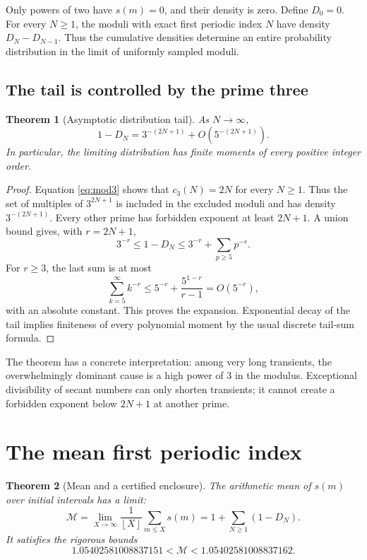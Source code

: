 \documentclass[11pt,a4paper]{article}
\numberwithin{equation}{section}
\newtheorem{theorem}{Theorem}[section]
\theoremstyle{definition}
\newcommand{\floor}[1]{\left\lfloor #1\right\rfloor}
\begin{document}
Only powers of two have $s(m)=0$, and their density is zero. Define $D_0=0$.
For every $N\ge1$, the moduli with exact first periodic index $N$ have
density $D_N-D_{N-1}$. Thus the cumulative densities determine an entire
probability distribution in the limit of uniformly sampled moduli.

\subsection{The tail is controlled by the prime three}

\begin{theorem}[Asymptotic distribution tail]\label{thm:tail}
As $N\to\infty$,
\begin{equation}\label{eq:tail}
1-D_N=3^{-(2N+1)}+O\!\left(5^{-(2N+1)}\right).
\end{equation}
In particular, the limiting distribution has finite moments of every
positive integer order.
\end{theorem}

\begin{proof}
Equation \eqref{eq:mod3} shows that $c_3(N)=2N$ for every $N\ge1$.
Thus the set of multiples of $3^{2N+1}$ is included in the excluded
moduli and has density $3^{-(2N+1)}$. Every other prime has forbidden
exponent at least $2N+1$. A union bound gives, with $r=2N+1$,
\[
3^{-r}\le1-D_N\le3^{-r}+\sum_{p\ge5}p^{-r}.
\]
For $r\ge3$, the last sum is at most
\[
\sum_{k=5}^\infty k^{-r}
\le5^{-r}+\frac{5^{1-r}}{r-1}=O(5^{-r}),
\]
with an absolute constant. This proves the expansion. Exponential decay
of the tail implies finiteness of every polynomial moment by the usual
discrete tail-sum formula.
\end{proof}

The theorem has a concrete interpretation: among very long transients,
the overwhelmingly dominant cause is a high power of $3$ in the modulus.
Exceptional divisibility of secant numbers can only shorten transients;
it cannot create a forbidden exponent below $2N+1$ at another prime.

\section{The mean first periodic index}
\label{sec:mean}

\begin{theorem}[Mean and a certified enclosure]\label{thm:mean}
The arithmetic mean of $s(m)$ over initial intervals has a limit:
\begin{equation}\label{eq:mean}
\mathcal M=\lim_{X\to\infty}\frac1{\floor X}\sum_{m\le X}s(m)
=1+\sum_{N\ge1}(1-D_N).
\end{equation}
It satisfies the rigorous bounds
\begin{equation}\label{eq:meaninterval}
1.05402581008837151<\mathcal M<1.05402581008837162.
\end{equation}
\end{theorem}
\end{document}
